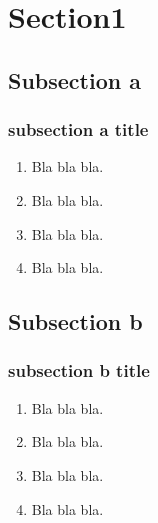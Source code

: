 \section{Section1}
%
\subsection{Subsection a}
\begin{frame}[label=sectiona]
\frametitle{subsection a title} 
\begin{enumerate}
\item Bla bla bla.\\
\item Bla bla bla.\\
\item Bla bla bla.\\
\item Bla bla bla.\\
\end{enumerate}
\end{frame}


%
\subsection{Subsection b}
\begin{frame}[label=sectionb]
\frametitle{subsection b title} 
\begin{enumerate}
\item Bla bla bla.\\
\item Bla bla bla.\\
\item Bla bla bla.\\
\item Bla bla bla.\\
\end{enumerate}
\end{frame}
